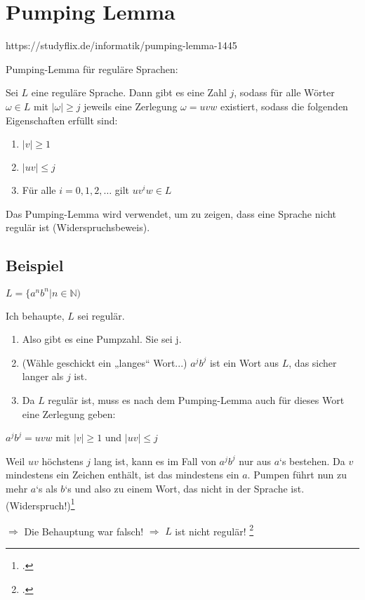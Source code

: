 \documentclass{lehramt-informatik-haupt}
\begin{document}
\section{Pumping Lemma}

https://studyflix.de/informatik/pumping-lemma-1445

Pumping-Lemma für reguläre Sprachen:

Sei $L$ eine reguläre Sprache. Dann gibt es eine Zahl $j$, sodass für
alle Wörter $ω ∈ L$ mit $|\omega| \geq j$ jeweils eine Zerlegung $\omega
= uvw$ existiert, sodass die folgenden Eigenschaften erfüllt sind:

\begin{enumerate}
\item $|v| \geq 1$
\item $|uv| \leq j$
\item Für alle $i = 0, 1, 2, \dots$ gilt $uv^iw \in L$
\end{enumerate}

Das Pumping-Lemma wird verwendet, um zu zeigen, dass eine
Sprache nicht regulär ist (Widerspruchsbeweis).

%

\subsection{Beispiel}

$L = \{a^n b^n | n \in \mathbb{N})$

Ich behaupte, $L$ sei regulär.

\begin{enumerate}
\item Also gibt es eine Pumpzahl. Sie sei j.
\item (Wähle geschickt ein „langes“ Wort...)
$a^j b^j$ ist ein Wort aus $L$, das sicher langer als $j$ ist.
\item Da $L$ regulär ist, muss es nach dem Pumping-Lemma auch für dieses
Wort eine Zerlegung geben:
\end{enumerate}

$a^j b^j = uvw$ mit $|v| \geq 1$ und $|uv| \leq j$

Weil $uv$ höchstens $j$ lang ist, kann es im Fall von $a^j b^j$ nur aus
$a$‘s bestehen. Da $v$ mindestens ein Zeichen enthält, ist das
mindestens ein $a$. Pumpen führt nun zu mehr $a$‘s als $b$‘s und also zu
einem Wort, das nicht in der Sprache ist. (Widerspruch!)\footcite{wiki:pumping}

$\Rightarrow$ Die Behauptung war falsch!
$\Rightarrow$ $L$ ist nicht regulär!
\footcite[Seite 63-64]{theo:fs:1}

\literatur
\end{document}
